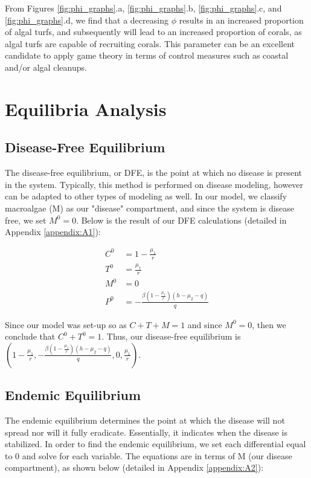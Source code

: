 \documentclass[12pt]{article}
\begin{document}
From Figures \ref{fig:phi_graphs}.a, \ref{fig:phi_graphs}.b, \ref{fig:phi_graphs}.c, and \ref{fig:phi_graphs}.d, we find that a decreasing $\phi$ results in an increased proportion of algal turfs, and subsequently will lead to an increased proportion of corals, as algal turfs are capable of recruiting corals. This parameter can be an excellent candidate to apply game theory in terms of control measures such as coastal and/or algal cleanups. \\


\section{Equilibria Analysis}
\subsection{Disease-Free Equilibrium}
The disease-free equilibrium, or DFE, is the point at which no disease is present in the system. Typically, this method is performed on disease modeling, however can be adapted to other types of modeling as well. In our model, we classify macroalgae (M) as our "disease" compartment, and since the system is disease free, we set $M^{0} = 0$. Below is the result of our DFE calculations (detailed in Appendix \ref{appendix:A1}):

\begin{align*}
        C^{0} &= 1 - \frac{\mu_{1}}{r} 
        \label{eq:C0} \\
        T^{0} &= \frac{\mu_{1}}{r} 
        \label{eq:T0} \\
        M^{0} &= 0 
        \label{eq:M0} \\
        P^{0} &= -\frac{\beta(1 - \frac{\mu_{1}}{r})(h - \mu_{2} - q)}{q}
        \label{eq:P0}
\end{align*}

Since our model was set-up so as $C+T+M=1$ and since $M^{0} = 0$, then we conclude that $C^{0} + T^{0} = 1$. Thus, our disease-free equilibrium is $(1 - \frac{\mu_{1}}{r}, -\frac{\beta(1 - \frac{\mu_{1}}{r})(h - \mu_{2} - q)}{q}, 0, \frac{\mu_{1}}{r})$.

\subsection{Endemic Equilibrium}
The endemic equilibrium determines the point at which the disease will not spread nor will it fully eradicate. Essentially, it indicates when the disease is stabilized. In order to find the endemic equilibrium, we set each differential equal to 0 and solve for each variable. The equations are in terms of M (our disease compartment), as shown below (detailed in Appendix \ref{appendix:A2}):
\end{document}
